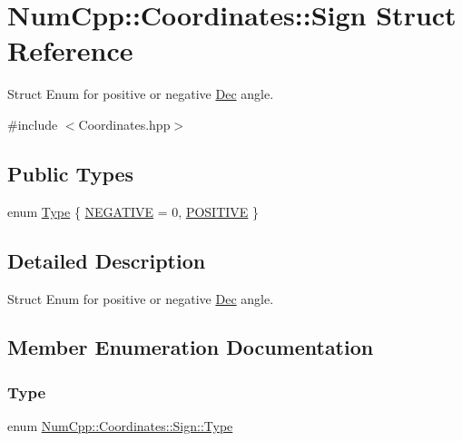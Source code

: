 \hypertarget{struct_num_cpp_1_1_coordinates_1_1_sign}{}\section{Num\+Cpp\+:\+:Coordinates\+:\+:Sign Struct Reference}
\label{struct_num_cpp_1_1_coordinates_1_1_sign}


Struct Enum for positive or negative \mbox{\hyperlink{class_num_cpp_1_1_coordinates_1_1_dec}{Dec}} angle.  




{\ttfamily \#include $<$Coordinates.\+hpp$>$}

\subsection*{Public Types}
\begin{DoxyCompactItemize}
\item 
enum \mbox{\hyperlink{struct_num_cpp_1_1_coordinates_1_1_sign_a6ef8423d5e83675773c2d4f32490e04b}{Type}} \{ \mbox{\hyperlink{struct_num_cpp_1_1_coordinates_1_1_sign_a6ef8423d5e83675773c2d4f32490e04ba1e7d6094d2b86466b2aea4cd12a70dc3}{N\+E\+G\+A\+T\+I\+VE}} = 0, 
\mbox{\hyperlink{struct_num_cpp_1_1_coordinates_1_1_sign_a6ef8423d5e83675773c2d4f32490e04baa08e24c64bf1939a54a23db735e1db85}{P\+O\+S\+I\+T\+I\+VE}}
 \}
\end{DoxyCompactItemize}


\subsection{Detailed Description}
Struct Enum for positive or negative \mbox{\hyperlink{class_num_cpp_1_1_coordinates_1_1_dec}{Dec}} angle. 

\subsection{Member Enumeration Documentation}
\mbox{\label{struct_num_cpp_1_1_coordinates_1_1_sign_a6ef8423d5e83675773c2d4f32490e04b}} 
\subsubsection{\texorpdfstring{Type}{Type}}
{\footnotesize\ttfamily enum \mbox{\hyperlink{struct_num_cpp_1_1_coordinates_1_1_sign_a6ef8423d5e83675773c2d4f32490e04b}{Num\+Cpp\+::\+Coordinates\+::\+Sign\+::\+Type}}}

